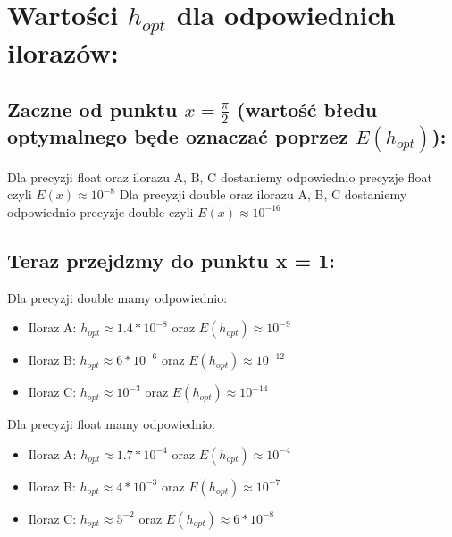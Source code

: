 \documentclass[12pt]{article}
\begin{document}
\section{Wartości $h_{opt}$ dla odpowiednich ilorazów:}
\subsection*{Zaczne od punktu $x = \frac{\pi}{2}$ (wartość błedu optymalnego będe oznaczać poprzez $E(h_{opt})$):}
Dla precyzji float oraz ilorazu A, B, C dostaniemy odpowiednio precyzje float czyli $E(x) \approx 10^{-8}$
\newline
\newline
Dla precyzji double oraz ilorazu A, B, C dostaniemy odpowiednio precyzje double czyli $E(x) \approx 10^{-16}$
\newline
\newline
\subsection*{Teraz przejdzmy do punktu x = 1:}
Dla precyzji double mamy odpowiednio:
\begin{itemize}
    \item Iloraz A: $h_{opt} \approx 1.4 * 10^{-8}$ oraz $E(h_{opt}) \approx 10^{-9}$
    \item Iloraz B: $h_{opt} \approx 6 * 10^{-6}$ oraz $E(h_{opt}) \approx 10^{-12}$
    \item Iloraz C: $h_{opt} \approx  10^{-3}$ oraz $E(h_{opt}) \approx 10^{-14}$
\end{itemize}
Dla precyzji float mamy odpowiednio:
\begin{itemize}
    \item Iloraz A: $h_{opt} \approx 1.7 * 10^{-4}$ oraz $E(h_{opt}) \approx 10^{-4}$
    \item Iloraz B: $h_{opt} \approx 4 * 10^{-3}$ oraz $E(h_{opt}) \approx 10^{-7}$
    \item Iloraz C: $h_{opt} \approx 5^{-2}$ oraz $E(h_{opt}) \approx 6*10^{-8}$
\end{itemize}
\end{document}
